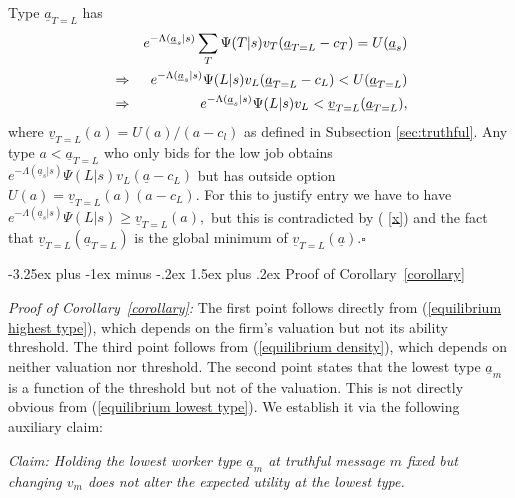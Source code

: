 \documentclass[12pt]{article}
\makeatletter
\renewcommand{\subsection}{%
  \@startsection{subsection}{2}{\z@}%
  {-3.25ex plus -1ex minus -.2ex}%
  {1.5ex plus .2ex}%
  {\normalfont\large\bfseries}%
}
\makeatother
\begin{document}
Type $\underline{a}_{T=L}$ has 
\begin{eqnarray}
&&e^{-\Lambda (\underline{a}_{s}|s)}\sum_{T}\Psi (T|s)v_{T}(\underline{a}%
_{T=L}-c_{T})=U(\underline{a}_{s})  \notag \\
&\Rightarrow &e^{-\Lambda (\underline{a}_{s}|s)}\Psi (L|s)v_{L}(\underline{a}%
_{T=L}-c_{L})<U(\underline{a}_{T=L})  \notag \\
&\Rightarrow &e^{-\Lambda (\underline{a}_{s}|s)}\Psi (L|s)v_{L}<\underline{v}%
_{T=L}(\underline{a}_{T=L}),  \label{x}
\end{eqnarray}%
where $\underline{v}_{T=L}(a)=U(a)/(a-c_{l})$ as defined in Subsection \ref{sec:truthful}. Any type $a<\underline{a}_{T=L}$ who only bids for the low
job obtains $e^{-\Lambda (\underline{a}_{s}|s)}\Psi (L|s)v_{L}(\underline{a}%
-c_{L})$ but has outside option $U(a)=\underline{v}_{T=L}(a)(a-c_{L}).$ For
this to justify entry we have to have $e^{-\Lambda (\underline{a}%
_{s}|s)}\Psi (L|s)\geq \underline{v}_{T=L}(a),$ but this is contradicted by (%
\ref{x}) and the fact that $\underline{v}_{T=L}(\underline{a}_{T=L})$ is the
global minimum of $\underline{v}_{T=L}(\underline{a}).\square $




\subsection{Proof of Corollary~\ref{corollary}}\label{online_app:proof_corollary}

\textit{Proof of Corollary~\ref{corollary}:}
The first point follows directly from (\ref{equilibrium highest type}), which depends on the firm's valuation but not its ability threshold. The third point follows from (\ref{equilibrium density}), which depends on neither valuation nor threshold. The second point states that the lowest type $\underline{a}_{m}$ is a function of the threshold but not of the valuation. This is not directly obvious from (\ref{equilibrium lowest type}). We establish it via the following auxiliary claim:

\bigskip

\noindent \textit{Claim: Holding the lowest worker type $\underline{a}_{m}$ at truthful message $m$ fixed but changing $v_{m}$ does not alter the expected utility at the lowest type.}

\bigskip
\end{document}
